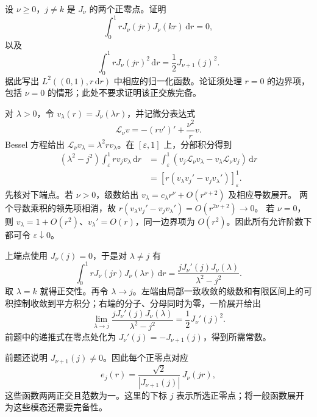 \begin{exercise}\label{b2:ex:A2-bessel-orthogonality}
设 \(\nu\geq0\)，\(j\ne k\) 是 \(J_\nu\) 的两个正零点。证明
\[
 \int_0^1rJ_\nu(jr)J_\nu(kr)\,\mathrm dr=0,
\]
以及
\[
 \int_0^1rJ_\nu(jr)^2\,\mathrm dr
       =\frac12J_{\nu+1}(j)^2.
\]
据此写出 \(L^2((0,1),r\,\mathrm dr)\) 中相应的归一化函数。论证须处理 \(r=0\) 的边界项，包括 \(\nu=0\) 的情形；此处不要求证明该正交族完备。
\end{exercise}
\begin{solution}
对 \(\lambda>0\)，令 \(v_\lambda(r)=J_\nu(\lambda r)\)，并记微分表达式
\[
 \mathscr L_\nu v=-(rv')'+\frac{\nu^2}{r}v.
\]
Bessel 方程给出 \(\mathscr L_\nu v_\lambda=\lambda^2rv_\lambda\)。在
\([\varepsilon,1]\) 上，分部积分得到
\[
 \begin{aligned}
 (\lambda^2-j^2)\int_\varepsilon^1rv_jv_\lambda\,\mathrm dr
 &=\int_\varepsilon^1
       (v_j\mathscr L_\nu v_\lambda-v_\lambda\mathscr L_\nu v_j)\,\mathrm dr\\
 &=\left[r(v_\lambda v_j'-v_jv_\lambda')\right]_\varepsilon^1.
 \end{aligned}
\]
先核对下端点。若 \(\nu>0\)，级数给出
\(v_\lambda=c_\lambda r^\nu+O(r^{\nu+2})\) 及相应导数展开。
两个导数乘积的领先项相消，故
\(r(v_\lambda v_j'-v_jv_\lambda')=O(r^{2\nu+2})\to0\)。
若 \(\nu=0\)，则 \(v_\lambda=1+O(r^2)\)、\(v_\lambda'=O(r)\)，同一边界项为 \(O(r^2)\)。因此所有允许阶数下都可令 \(\varepsilon\downarrow0\)。

上端点使用 \(J_\nu(j)=0\)，于是对 \(\lambda\ne j\) 有
\[
 \int_0^1rJ_\nu(jr)J_\nu(\lambda r)\,\mathrm dr
 =\frac{jJ_\nu'(j)J_\nu(\lambda)}{\lambda^2-j^2}.
\]
取 \(\lambda=k\) 就得正交性。再令 \(\lambda\to j\)。左端由局部一致收敛的级数和有限区间上的可积控制收敛到平方积分；右端的分子、分母同时为零，一阶展开给出
\[
 \lim_{\lambda\to j}
 \frac{jJ_\nu'(j)J_\nu(\lambda)}{\lambda^2-j^2}
 =\frac12J_\nu'(j)^2.
\]
前题中的递推式在零点处化为
\(J_\nu'(j)=-J_{\nu+1}(j)\)，得到所需常数。

前题还说明 \(J_{\nu+1}(j)\ne0\)。因此每个正零点对应
\[
 e_j(r)=\frac{\sqrt2}{|J_{\nu+1}(j)|}\,J_\nu(jr),
\]
这些函数两两正交且范数为一。这里的下标 \(j\) 表示所选正零点；将一般函数展开为这些模态还需要完备性。
\end{solution}

